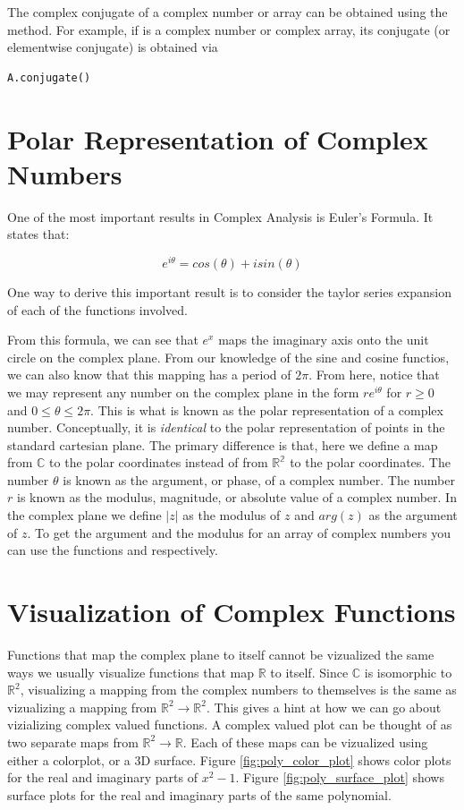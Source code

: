 The complex conjugate of a complex number or array can be obtained using the  method.
For example, if  is a complex number or complex array, its conjugate (or elementwise conjugate) is obtained via
\begin{lstlisting}
A.conjugate()
\end{lstlisting}

\section*{Polar Representation of Complex Numbers}

One of the most important results in Complex Analysis is Euler's Formula.
It states that:

\[e^{i\theta}=cos(\theta)+i sin(\theta)\]

One way to derive this important result is to consider the taylor series expansion of each of the functions involved.

From this formula, we can see that $e^x$ maps the imaginary axis onto the unit circle on the complex plane.
From our knowledge of the sine and cosine functios, we can also know that this mapping has a period of $2\pi$.
From here, notice that we may represent any number on the complex plane in the form $r e^{i\theta}$ for $r\geq 0$ and $0 \leq \theta \leq 2\pi$.
This is what is known as the polar representation of a complex number.
Conceptually, it is \emph{identical} to the polar representation of points in the standard cartesian plane.
The primary difference is that, here we define a map from $\mathbb{C}$ to the polar coordinates instead of from $\mathbb{R^{2}}$ to the polar coordinates.
The number $\theta$ is known as the argument, or phase, of a complex number.
The number $r$ is known as the modulus, magnitude, or absolute value of a complex number.
In the complex plane we define $|z|$ as the modulus of $z$ and $arg(z)$ as the argument of $z$.
To get the argument and the modulus for an array of complex numbers you can use the functions  and  respectively.

\section*{Visualization of Complex Functions}
Functions that map the complex plane to itself cannot be vizualized the same ways we usually visualize functions that map $\mathbb{R}$ to itself.
Since $\mathbb{C}$ is isomorphic to $\mathbb{R}^2$, visualizing a mapping from the complex numbers to themselves is the same as vizualizing a mapping from $\mathbb{R}^2 \to \mathbb{R}^2$.
This gives a hint at how we can go about vizializing complex valued functions.
A complex valued plot can be thought of as two separate maps from $\mathbb{R}^2 \to \mathbb{R}$.
Each of these maps can be vizualized using either a colorplot, or a 3D surface.
Figure \ref{fig:poly_color_plot} shows color plots for the real and imaginary parts of $x^2 - 1$.
Figure \ref{fig:poly_surface_plot} shows surface plots for the real and imaginary parts of the same polynomial.

